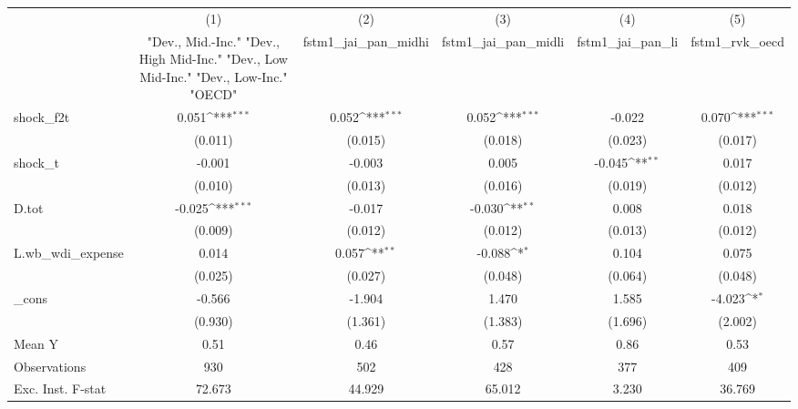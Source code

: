 {
\def\sym#1{\ifmmode^{#1}\else\(^{#1}\)\fi}
\begin{tabular}{l*{5}{c}}
\toprule
            &\multicolumn{1}{c}{(1)}&\multicolumn{1}{c}{(2)}&\multicolumn{1}{c}{(3)}&\multicolumn{1}{c}{(4)}&\multicolumn{1}{c}{(5)}\\
            &\multicolumn{1}{c}{ "Dev., Mid.-Inc." "Dev., High Mid-Inc." "Dev., Low Mid-Inc." "Dev., Low-Inc." "OECD" }&\multicolumn{1}{c}{fstm1\_jai\_pan\_midhi}&\multicolumn{1}{c}{fstm1\_jai\_pan\_midli}&\multicolumn{1}{c}{fstm1\_jai\_pan\_li}&\multicolumn{1}{c}{fstm1\_rvk\_oecd}\\
\midrule
shock\_f2t   &       0.051\sym{***}&       0.052\sym{***}&       0.052\sym{***}&      -0.022         &       0.070\sym{***}\\
            &     (0.011)         &     (0.015)         &     (0.018)         &     (0.023)         &     (0.017)         \\
\addlinespace
shock\_t     &      -0.001         &      -0.003         &       0.005         &      -0.045\sym{**} &       0.017         \\
            &     (0.010)         &     (0.013)         &     (0.016)         &     (0.019)         &     (0.012)         \\
\addlinespace
D.tot       &      -0.025\sym{***}&      -0.017         &      -0.030\sym{**} &       0.008         &       0.018         \\
            &     (0.009)         &     (0.012)         &     (0.012)         &     (0.013)         &     (0.012)         \\
\addlinespace
L.wb\_wdi\_expense&       0.014         &       0.057\sym{**} &      -0.088\sym{*}  &       0.104         &       0.075         \\
            &     (0.025)         &     (0.027)         &     (0.048)         &     (0.064)         &     (0.048)         \\
\addlinespace
\_cons      &      -0.566         &      -1.904         &       1.470         &       1.585         &      -4.023\sym{*}  \\
            &     (0.930)         &     (1.361)         &     (1.383)         &     (1.696)         &     (2.002)         \\
\midrule
Mean Y      &        0.51         &        0.46         &        0.57         &        0.86         &        0.53         \\
Observations&         930         &         502         &         428         &         377         &         409         \\
Exc. Inst. F-stat&      72.673         &      44.929         &      65.012         &       3.230         &      36.769         \\
\bottomrule
\end{tabular}
}
